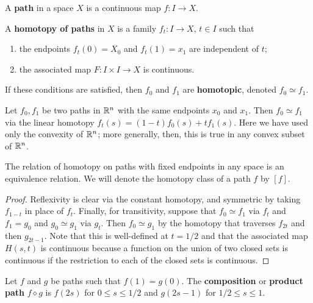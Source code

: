 \documentclass{../mathnotes}
\begin{document}
\begin{defn}
    A \textbf{path} in a space $X$ is a continuous map $f:I\to X$.
\end{defn}

\begin{defn}
    A \textbf{homotopy of paths} in $X$ is a family $f_t:I\to X$, $t\in I$ such that
    \begin{enumerate}
        \item the endpoints $f_t(0)=X_0$ and $f_t(1)=x_1$ are independent of $t$;
        \item the associated map $F:I\times I\to X$ is continuous.
    \end{enumerate}
    If these conditions are satisfied, then $f_0$ and $f_1$ are \textbf{homotopic}, denoted $f_0\simeq f_1$.
\end{defn}

\begin{exmp}
    Let $f_0,f_1$ be two paths in $\mathbb{R}^n$ with the same endpoints $x_0$ and $x_1$. Then $f_0\simeq f_1$
    via the linear homotopy $f_t(s)=(1-t)f_0(s)+tf_1(s)$. Here we have used only the convexity of $\mathbb{R}^n$;
    more generally, then, this is true in any convex subset of $\mathbb{R}^n$.
\end{exmp}

\begin{prop}
    The relation of homotopy on paths with fixed endpoints in any space is an equivalence relation.
    We will denote the homotopy class of a path $f$ by $[f]$.
\end{prop}
\begin{proof}
    Reflexivity is clear via the constant homotopy, and symmetric by taking $f_{1-t}$ in place of $f_t$.
    Finally, for transitivity, suppose that $f_0\simeq f_1$ via $f_t$ and $f_1=g_0$ and $g_0\simeq g_1$
    via $g_t$. Then $f_0\simeq g_1$ by the homotopy that traverses $f_{2t}$ and then $g_{2t-1}$. Note that
    this is well-defined at $t=1/2$ and that the associated map $H(s,t)$ is continuous because a function
    on the union of two closed sets is continuous if the restriction to each of the closed
    sets is continuous.
\end{proof}

\begin{defn}
    Let $f$ and $g$ be paths such that $f(1)=g(0)$. The \textbf{composition} or \textbf{product path}
    $f\diamond g$ is $f(2s)$ for $0\leq s\leq 1/2$ and $g(2s-1)$ for $1/2\leq s\leq 1$.
\end{defn}
\end{document}
